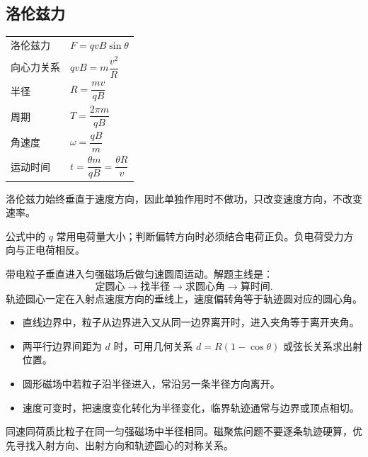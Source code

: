 
\subsection{洛伦兹力}

\begin{tabularx}{\columnwidth}{XX}
  洛伦兹力&$F=qvB\sin\theta$\\
  向心力关系&$qvB=m\dfrac{v^2}{R}$\\
  半径&$R=\dfrac{mv}{qB}$\\
  周期&$T=\dfrac{2\pi m}{qB}$\\
  角速度&$\omega=\dfrac{qB}{m}$\\
  运动时间&$t=\dfrac{\theta m}{qB}=\dfrac{\theta R}{v}$\\
\end{tabularx}

\begin{formulanotebox}
洛伦兹力始终垂直于速度方向，因此单独作用时不做功，只改变速度方向，不改变速率。

公式中的 $q$ 常用电荷量大小；判断偏转方向时必须结合电荷正负。负电荷受力方向与正电荷相反。
\end{formulanotebox}

\begin{keypointbox}[title={\strut\textcolor{white}{\bfseries 重点知识点：圆周偏转模型}}]
带电粒子垂直进入匀强磁场后做匀速圆周运动。解题主线是：
\[
  \text{定圆心} \rightarrow \text{找半径} \rightarrow \text{求圆心角} \rightarrow \text{算时间}.
\]
轨迹圆心一定在入射点速度方向的垂线上，速度偏转角等于轨迹圆对应的圆心角。
\end{keypointbox}

\begin{casetypebox}[title={\strut\textcolor{white}{\bfseries 常见题型：边界磁场}}]
\begin{itemize}[leftmargin=1.5em]
  \item 直线边界中，粒子从边界进入又从同一边界离开时，进入夹角等于离开夹角。
  \item 两平行边界间距为 $d$ 时，可用几何关系 $d=R(1-\cos\theta)$ 或弦长关系求出射位置。
  \item 圆形磁场中若粒子沿半径进入，常沿另一条半径方向离开。
  \item 速度可变时，把速度变化转化为半径变化，临界轨迹通常与边界或顶点相切。
\end{itemize}
\end{casetypebox}

\begin{casetypebox}[title={\strut\textcolor{white}{\bfseries 常见题型：磁聚焦}}]
同速同荷质比粒子在同一匀强磁场中半径相同。磁聚焦问题不要逐条轨迹硬算，优先寻找入射方向、出射方向和轨迹圆心的对称关系。

\begin{center}
  
\end{center}
\end{casetypebox}
